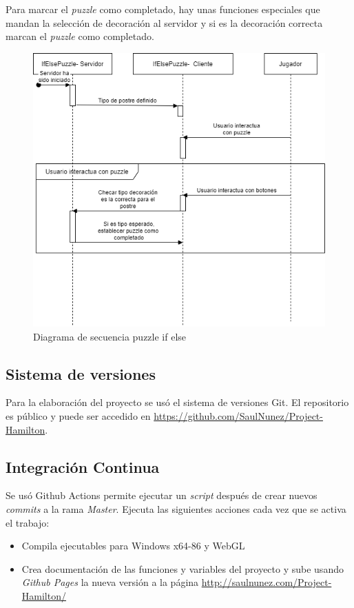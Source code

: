 \begin{itemize}
    Para marcar el \textit{puzzle} como completado, hay unas funciones especiales que mandan la selección de decoración al servidor y si es la decoración correcta marcan el \textit{puzzle} como completado.
    \begin{figure}[H]
        \centering
        \includegraphics[width=0.8\linewidth]{images/DiagramaSecuenciaPuzzleIfElse.png}
        \caption{Diagrama de secuencia puzzle if else}
        \label{fig:diagrama_sec_if_else}
    \end{figure}
\end{itemize}

\subsection{Sistema de versiones}
Para la elaboración del proyecto se usó el sistema de versiones Git. El repositorio es público y puede ser accedido en \url{https://github.com/SaulNunez/Project-Hamilton}.

\subsection{Integración Continua}
Se usó Github Actions permite ejecutar un \textit{script} después de crear nuevos \textit{commits} a la rama \textit{Master}.
Ejecuta las siguientes acciones cada vez que se activa el trabajo:
\begin{itemize}
    \item Compila ejecutables para Windows x64-86 y WebGL
    \item Crea documentación de las funciones y variables del proyecto y sube usando \textit{Github Pages} la nueva versión a la página \url{http://saulnunez.com/Project-Hamilton/}
\end{itemize}

